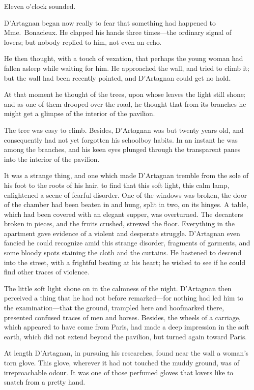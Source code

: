 Eleven o'clock sounded. 

D'Artagnan began now really to fear that something had happened to Mme.~Bonacieux. He clapped his hands three times—the ordinary signal of lovers; but nobody replied to him, not even an echo. 

He then thought, with a touch of vexation, that perhaps the young woman had fallen asleep while waiting for him. He approached the wall, and tried to climb it; but the wall had been recently pointed, and D'Artagnan could get no hold. 

At that moment he thought of the trees, upon whose leaves the light still shone; and as one of them drooped over the road, he thought that from its branches he might get a glimpse of the interior of the pavilion. 

The tree was easy to climb. Besides, D'Artagnan was but twenty years old, and consequently had not yet forgotten his schoolboy habits. In an instant he was among the branches, and his keen eyes plunged through the transparent panes into the interior of the pavilion. 

It was a strange thing, and one which made D'Artagnan tremble from the sole of his foot to the roots of his hair, to find that this soft light, this calm lamp, enlightened a scene of fearful disorder. One of the windows was broken, the door of the chamber had been beaten in and hung, split in two, on its hinges. A table, which had been covered with an elegant supper, was overturned. The decanters broken in pieces, and the fruits crushed, strewed the floor. Everything in the apartment gave evidence of a violent and desperate struggle. D'Artagnan even fancied he could recognize amid this strange disorder, fragments of garments, and some bloody spots staining the cloth and the curtains. He hastened to descend into the street, with a frightful beating at his heart; he wished to see if he could find other traces of violence. 

The little soft light shone on in the calmness of the night. D'Artagnan then perceived a thing that he had not before remarked—for nothing had led him to the examination—that the ground, trampled here and hoofmarked there, presented confused traces of men and horses. Besides, the wheels of a carriage, which appeared to have come from Paris, had made a deep impression in the soft earth, which did not extend beyond the pavilion, but turned again toward Paris. 

At length D'Artagnan, in pursuing his researches, found near the wall a woman's torn glove. This glove, wherever it had not touched the muddy ground, was of irreproachable odour. It was one of those perfumed gloves that lovers like to snatch from a pretty hand. 

